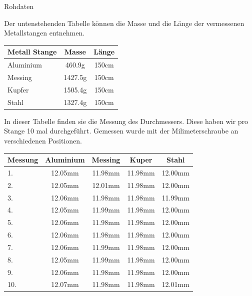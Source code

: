 \documentclass[twoside]{protokoll}
\begin{document}
\begin{aufgabe}{Rohdaten}

Der untenstehenden Tabelle können die Masse und die Länge der vermessenen Metallstangen entnehmen.  
    \begin{table}[h]
        \centering
        \begin{tabularx}{0.8\textwidth}{X c c} %
            \toprule
            \textbf{Metall Stange} & \textbf{Masse} & \textbf{Länge} \\
            \midrule
            Aluminium & 460.9g & 150cm \\
            Messing & 1427.5g & 150cm \\
            Kupfer & 1505.4g & 150cm \\
            Stahl & 1327.4g & 150cm \\
            \bottomrule
        \end{tabularx}
        \label{tab:mytable}
    \end{table}

In dieser Tabelle finden sie die Messung des Durchmessers. Diese haben wir pro Stange 10 mal durchgeführt. Gemessen wurde mit der Milimeterschraube an verschiedenen Positionen.
    \begin{table}[h]
        \centering
        \begin{tabularx}{0.8\textwidth}{X c c c c} %
            \toprule
            \textbf{Messung} & \textbf{Aluminium} & \textbf{Messing} & \textbf{Kuper} & \textbf{Stahl} \\
            \midrule
            1. & 12.05mm & 11.98mm & 11.98mm & 12.00mm \\
            2. & 12.05mm & 12.01mm & 11.98mm & 12.00mm \\
            3. & 12.06mm & 11.98mm & 11.98mm & 11.99mm \\
            4. & 12.05mm & 11.99mm & 11.98mm & 12.00mm \\
            5. & 12.06mm & 11.98mm & 11.98mm & 12.00mm \\
            6. & 12.06mm & 11.98mm & 11.98mm & 12.00mm \\
            7. & 12.06mm & 11.99mm & 11.98mm & 12.00mm \\
            8. & 12.05mm & 11.99mm & 11.98mm & 12.00mm \\
            9. & 12.06mm & 11.98mm & 11.98mm & 12.00mm \\
            10.& 12.07mm & 11.98mm & 11.98mm & 12.01mm \\
            \bottomrule
        \end{tabularx}
        \label{tab:mytable}
    \end{table}
    


\end{aufgabe}
\end{document}
